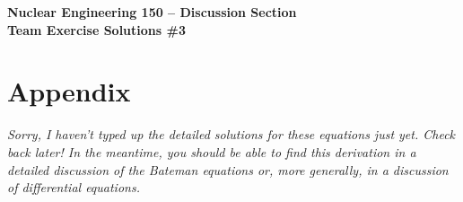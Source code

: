 \documentclass{report}
\begin{document}
\begin{center}
\textbf{\large Nuclear Engineering 150 -- Discussion Section}\\ 
\textbf{Team Exercise Solutions \#3}
\end{center}



\newpage



\newpage

\section*{Appendix}

\textit{Sorry, I haven't typed up the detailed solutions for these equations just yet. Check back later! In the meantime, you should be able to find this derivation in a detailed discussion of the Bateman equations or, more generally, in a discussion of differential equations.}
\end{document}
